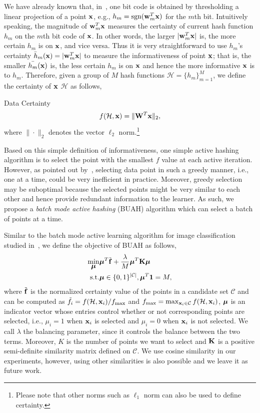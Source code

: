 We have already known that, in~\cite{wang2010cvpr}, one bit code is obtained by thresholding a linear projection of a point ${\bf x}$, e.g., $h_m = \mathop{\rm sgn}({\bf w}_m^T{\bf x})$ for the $m$th bit. Intuitively speaking, the magnitude of ${\bf w}_m^T{\bf x}$ measures the certainty of current hash function $h_m$ on the $m$th bit code of ${\bf x}$. In other words, the larger $|{\bf w}_m^T{\bf x}|$ is, the more certain $h_m$ is on ${\bf x}$, and vice versa. Thus it is very straightforward to use $h_m$'s certainty $\bar{h}_m({\bf x}) = |{\bf w}^T_m{\bf x}|$ to measure the informativeness of point ${\bf x}$; that is, the smaller $\bar{h_m}({\bf x})$ is, the less certain $h_m$ is on ${\bf x}$ and hence the more informative ${\bf x}$ is to $h_m$. Therefore, given a group of $M$ hash functions $\mathcal{H} =\{h_m\}_{m=1}^M$, we define the certainty of ${\bf x}$ \wrt $\mathcal{H}$ as follows,
\begin{mydef} Data Certainty
  \label{definition:certainty}
   \begin{align}
   f(\mathcal{H},{\bf x}) = \|{\bf W}^T{\bf x}\|_{2},\nonumber
    \end{align}
    where $\|\cdot\|_{2}$ denotes the vector $\ell_2$ norm.\footnote{Please note that other norms such as $\ell_1$ norm can also be used to define certainty.}
\end{mydef}

Based on this simple definition of informativeness, one simple active hashing algorithm is to select the point with the smallest $f$ value at each active iteration. However, as pointed out by~\cite{hoi2006www,Guo2007nips}, selecting data point in such a greedy manner, i.e., one at a time, could be very inefficient in practice. Moreover, greedy selection may be suboptimal because the selected points might be very similar to each other and hence provide redundant information to the learner. As such, we propose a \textit{batch mode active hashing} (\mbox{BUAH}) algorithm which can select a batch of points at a time.


Similar to the batch mode active learning algorithm for image classification studied in~\cite{hoi2006icml}, we define the objective of \mbox{BUAH} as follows,
\begin{eqnarray}
\label{equation:ah}
\min_{\mbox{\boldmath$\mu$\unboldmath}}&\mbox{\boldmath$\mu$\unboldmath}^T\tilde{{\bf f}}+\frac{\lambda}{M}\mbox{\boldmath$\mu$\unboldmath}^T{\bf K}\mbox{\boldmath$\mu$\unboldmath}\\
\mathop{\rm s.t.}& \mbox{\boldmath$\mu$\unboldmath}\in \{0,1\}^{|\mathcal{C}|}, \mbox{\boldmath$\mu$\unboldmath}^T{\bf 1}=M,\nonumber
\end{eqnarray}
where $\tilde{{\bf f}}$ is the normalized certainty value of the points in a candidate set $\mathcal{C}$ and can be computed as $\tilde{f}_i = f(\mathcal{H},{\bf x}_i)/f_{\max}$ and $ f_{\max} = \max_{{\bf x}_i\in\mathcal{C}} f(\mathcal{H},{\bf x}_i)$, $\mbox{\boldmath$\mu$\unboldmath}$ is an indicator vector whose entries control whether or not corresponding points are selected, i.e., $\mu_i = 1$ when ${\bf x}_i$ is selected and $\mu_i = 0$ when ${\bf x}_i$ is not selected. We call $\lambda$ the balancing parameter, since it controls the balance between the two terms. Moreover, $K$ is the number of points we want to select and ${\bf K}$ is a positive semi-definite similarity matrix defined on $\mathcal{C}$. We use cosine similarity in our experiments, however, using other similarities is also possible and we leave it as future work.

